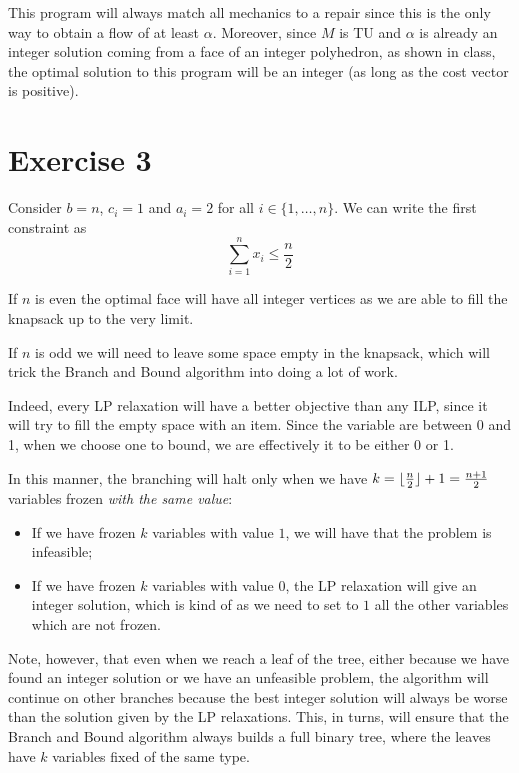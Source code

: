 \documentclass[12pt]{extarticle}
\numberwithin{equation}{section}
\begin{document}
This program will always match all mechanics to a repair since this is the only way to obtain a flow
of at least $\alpha$.
Moreover, since $M$ is TU and $\alpha$ is already an integer solution coming from a face of an
integer polyhedron, as shown in class, the optimal solution to this program will be an integer (as
long as the cost vector is positive).

\section*{Exercise 3}

Consider $b = n$, $c_i = 1$ and $a_i = 2$ for all $i \in \{ 1, \dots, n\}$.
We can write the first constraint as
\begin{equation}
	\sum_{i = 1}^n x_i \leq \frac{n}{2}
\end{equation}

If $n$ is even the optimal face will have all integer vertices as we are able to fill the knapsack
up to the very limit.

If $n$ is odd we will need to leave some space empty in the knapsack, which will trick the Branch
and Bound algorithm into doing a lot of work.

Indeed, every LP relaxation will have a better objective than any ILP, since it will try to fill the
empty space with an  item.
Since the variable are between 0 and 1, when we choose one to bound, we are effectively
 it to be either 0 or 1.

In this manner, the branching will halt only when we have
$k = \lfloor\frac{n}{2}\rfloor + 1 = \frac{n+1}{2}$ variables
frozen \emph{with the same value}:
\begin{itemize}
	\item If we have frozen $k$ variables with value $1$, we will have that the problem is
	      infeasible;
	\item If we have frozen $k$ variables with value $0$, the LP relaxation will give an integer
	      solution, which is kind of  as we need to set to $1$ all the other variables
	      which are not frozen.
\end{itemize}

Note, however, that even when we reach a leaf of the tree, either because we have found an integer
solution or we have an unfeasible problem, the algorithm will continue on other branches because the
best integer solution will always be worse than the solution given by the LP relaxations.
This, in turns, will ensure that the Branch and Bound algorithm always builds a full binary tree,
where the leaves have $k$ variables fixed of the same type.
\end{document}
